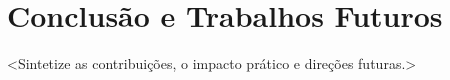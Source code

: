 \section{Conclus\~ao e Trabalhos Futuros}
\label{sec:conclusao}

<Sintetize as contribui\c{c}\~oes, o impacto pr\'atico e dire\c{c}\~oes futuras.>
